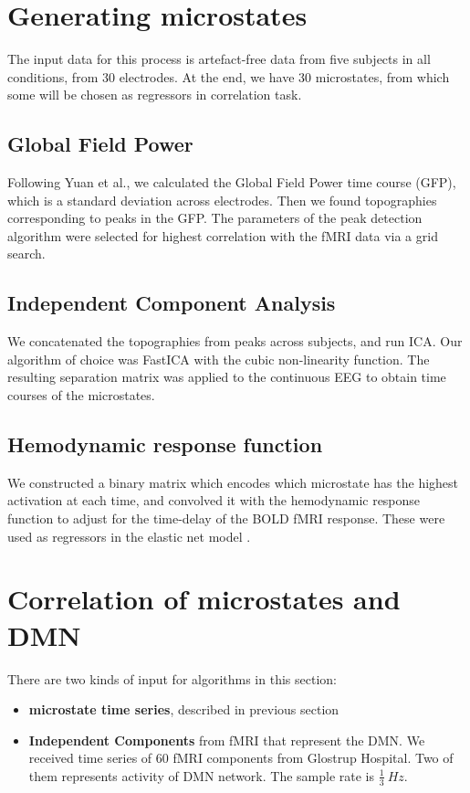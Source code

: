 \documentclass{article}
\begin{document}
\section{Generating microstates}
The input data for this process is artefact-free data from five subjects in all conditions, from 30 electrodes. At the end, we have 30 microstates, from which some will be chosen as regressors in correlation task. 
\subsection{Global Field Power}
Following Yuan et al., we calculated the Global Field Power time course (GFP), which is a standard deviation across electrodes. Then we found topographies corresponding to peaks in the GFP. The parameters of the peak detection algorithm were selected for highest correlation with the fMRI data via a grid search.
\subsection{Independent Component Analysis}
We concatenated the topographies from peaks across subjects, and run ICA. Our algorithm of choice was FastICA \cite{fast_robust} with the cubic non-linearity function. The resulting separation matrix was applied to the continuous EEG to obtain time courses of the microstates.
\subsection{Hemodynamic response function}   
We constructed a binary matrix which encodes which microstate has the highest activation at each time, and convolved it with the hemodynamic response function to adjust for the time-delay of the BOLD fMRI response. These were used as regressors in the elastic net model \cite{hastie01}. 

\section{Correlation of microstates and DMN}
There are two kinds of input for algorithms in this section:
\begin{itemize}
\item \textbf{microstate time series}, described in previous section 
\item \textbf{Independent Components} from fMRI that represent the DMN. We received time series of 60 fMRI components from Glostrup Hospital. Two of them represents activity of DMN network. The sample rate is $\frac{1}{3}~Hz$. 
\end{itemize} 
\end{document}
